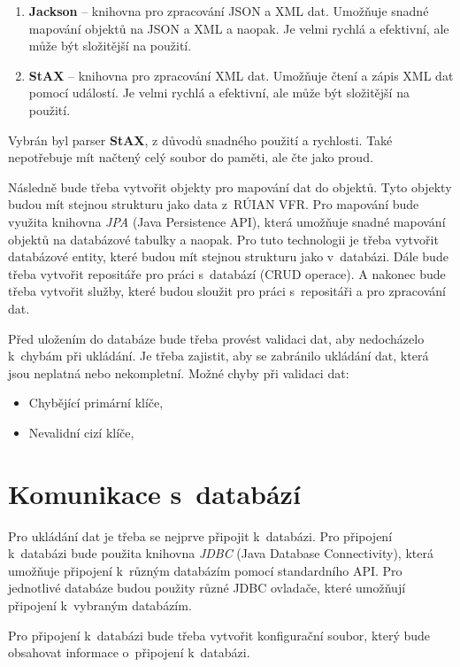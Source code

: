 \begin{enumerate}
    \item \textbf{Jackson} -- knihovna pro zpracování JSON a XML dat. Umožňuje snadné mapování 
    objektů na JSON a XML a naopak. Je velmi rychlá a efektivní, ale může být složitější na použití.
    \item \textbf{StAX} -- knihovna pro zpracování XML dat. Umožňuje 
    čtení a zápis XML dat pomocí událostí. Je velmi rychlá a efektivní, ale může být 
    složitější na použití.
\end{enumerate}

Vybrán byl parser \textbf{StAX}, z důvodů snadného použití a rychlosti.
Také nepotřebuje mít načtený celý soubor do paměti, ale čte jako proud.

Následně bude třeba vytvořit objekty pro mapování dat do objektů.
Tyto objekty budou mít stejnou strukturu jako data z~RÚIAN VFR.
Pro mapování bude využita knihovna \textit{JPA} (Java Persistence API), která umožňuje snadné 
mapování objektů na databázové tabulky a naopak.
Pro tuto technologii je třeba vytvořit databázové entity, které budou mít stejnou strukturu jako
v~databázi. Dále bude třeba vytvořit repositáře pro práci s~databází (CRUD operace).
A nakonec bude třeba vytvořit služby, které budou sloužit pro práci s~repositáři a pro zpracování dat.

Před uložením do databáze bude třeba provést validaci dat, aby nedocházelo k~chybám při
ukládání. Je třeba zajistit, aby se zabránilo ukládání dat, která jsou neplatná nebo nekompletní.
Možné chyby při validaci dat:
\begin{itemize}
    \item Chybějící primární klíče,
    \item Nevalidní cizí klíče,
\end{itemize}

\section{Komunikace s~databází}
\label{sec:komunikaceDB}
Pro ukládání dat je třeba se nejprve připojit k~databázi.
Pro připojení k~databázi bude použita knihovna \textit{JDBC} (Java Database Connectivity), která
umožňuje připojení k~různým databázím pomocí standardního API.
Pro jednotlivé databáze budou použity různé JDBC ovladače, které umožňují připojení k~vybraným databázím.

Pro připojení k~databázi bude třeba vytvořit konfigurační soubor, který bude obsahovat
informace o~připojení k~databázi.

